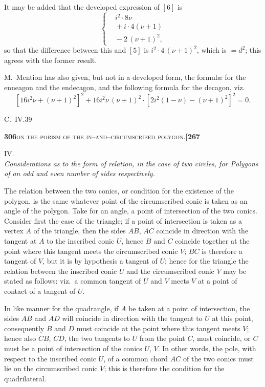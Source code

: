 \documentclass[11pt]{article}
\begin{document}
\medskip

\noindent It may be added that the developed expression of $[6]$ is
\[
\left\{\begin{aligned}&i^2\cdot 8\nu\\ &{}+ i\cdot 4(\nu+1)\\ &{}- 2\,(\nu+1)^2,\end{aligned}\right.
\]
so that the difference between this and $[5]$ is $i^2\cdot 4\,(\nu+1)^2$, which is $= d^2$; this agrees with the former result.

\medskip

\noindent M.~Mention has also given, but not in a developed form, the formul\ae{} for the enneagon and the endecagon, and the following formula for the decagon, viz.
\[
   [16 i^2 \nu + (\nu+1)^2]^2 + 16 i^2 \nu\,(\nu+1)^2\cdot[2 i^2(1 - \nu) - (\nu+1)^2]^2 = 0.
\]

\hfill C.~IV.\hfill 39

\newpage
\setcounter{page}{306}

\noindent\textbf{306}\hfill\textsc{on the porism of the in--and--circumscribed polygon.}\hfill\textbf{[267}

\medskip

\begin{center}\textsc{IV.}\\[0.3em]\textit{Considerations as to the form of relation, in the case of two circles, for Polygons of an odd and even number of sides respectively.}\end{center}

\medskip

\noindent The relation between the two conics, or condition for the existence of the polygon, is the same whatever point of the circumscribed conic is taken as an angle of the polygon. Take for an angle, a point of intersection of the two conics. Consider first the case of the triangle; if a point of intersection is taken as a vertex $A$ of the triangle, then the sides $AB$, $AC$ coincide in direction with the tangent at $A$ to the inscribed conic $U$, hence $B$ and $C$ coincide together at the point where this tangent meets the circumscribed conic $V$; $BC$ is therefore a tangent of $V$, but it is by hypothesis a tangent of $U$; hence for the triangle the relation between the inscribed conic $U$ and the circumscribed conic $V$ may be stated as follows: viz.\ a common tangent of $U$ and $V$ meets $V$ at a point of contact of a tangent of $U$.

\medskip

\noindent In like manner for the quadrangle, if $A$ be taken at a point of intersection, the sides $AB$ and $AD$ will coincide in direction with the tangent to $U$ at this point, consequently $B$ and $D$ must coincide at the point where this tangent meets $V$; hence also $CB$, $CD$, the two tangents to $U$ from the point $C$, must coincide, or $C$ must be a point of intersection of the conics $U$, $V$. In other words, the pole, with respect to the inscribed conic $U$, of a common chord $AC$ of the two conics must lie on the circumscribed conic $V$; this is therefore the condition for the quadrilateral.
\end{document}
